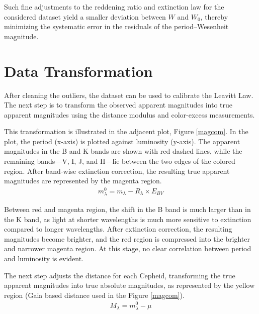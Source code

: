Such fine adjustments to the reddening ratio and extinction law for the considered dataset yield a smaller deviation between $W$ and $W_0$, thereby minimizing the systematic error in the residuals of the period–Wesenheit magnitude.

 

 

 


\section{Data Transformation}

After cleaning the outliers, the dataset can be used to calibrate the Leavitt Law. The next step is to transform the observed apparent magnitudes into true apparent magnitudes using the distance modulus and color-excess measurements.

This transformation is illustrated in the adjacent plot, Figure \ref{magcom}. In the plot, the period (x-axis) is plotted against luminosity (y-axis). The apparent magnitudes in the B and K bands are shown with red dashed lines, while the remaining bands—V, I, J, and H—lie between the two edges of the colored region. After band-wise extinction correction, the resulting true apparent magnitudes are represented by the magenta region.
\begin{align}
	m_\lambda^0 = m_\lambda - R_\lambda \times E_{BV}
	\label{true_apparent}
\end{align}

 

Between red and magenta region, the shift in the B band is much larger than in the K band, as light at shorter wavelengths is much more sensitive to extinction compared to longer wavelengths. After extinction correction, the resulting magnitudes become brighter, and the red region is compressed into the brighter and narrower magenta region. At this stage, no clear correlation between period and luminosity is evident.

The next step adjusts the distance for each Cepheid, transforming the true apparent magnitudes into true absolute magnitudes, as represented by the yellow region (Gaia based distance used in the Figure \ref{magcom}).
\begin{align}
	M_\lambda = m_\lambda^0 - \mu
	\label{true_absolute}
\end{align}

